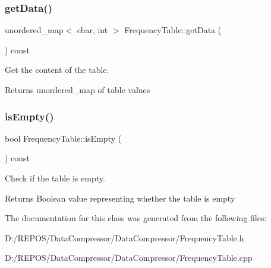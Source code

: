 \subsubsection{\texorpdfstring{getData()}{getData()}}
{\footnotesize\ttfamily unordered\+\_\+map$<$ char, int $>$ Frequency\+Table\+::get\+Data (\begin{DoxyParamCaption}{ }\end{DoxyParamCaption}) const}



Get the content of the table. 

\begin{DoxyReturn}{Returns}
unordered\+\_\+map of table values 
\end{DoxyReturn}
\mbox{\label{class_frequency_table_ab7a061dda60815f087bd2ccf41a2917f}} 
\subsubsection{\texorpdfstring{isEmpty()}{isEmpty()}}
{\footnotesize\ttfamily bool Frequency\+Table\+::is\+Empty (\begin{DoxyParamCaption}{ }\end{DoxyParamCaption}) const}



Check if the table is empty. 

\begin{DoxyReturn}{Returns}
Boolean value representing whether the table is empty 
\end{DoxyReturn}


The documentation for this class was generated from the following files\+:\begin{DoxyCompactItemize}
\item 
D\+:/\+R\+E\+P\+O\+S/\+Data\+Compressor/\+Data\+Compressor/Frequency\+Table.\+h\item 
D\+:/\+R\+E\+P\+O\+S/\+Data\+Compressor/\+Data\+Compressor/Frequency\+Table.\+cpp\end{DoxyCompactItemize}
